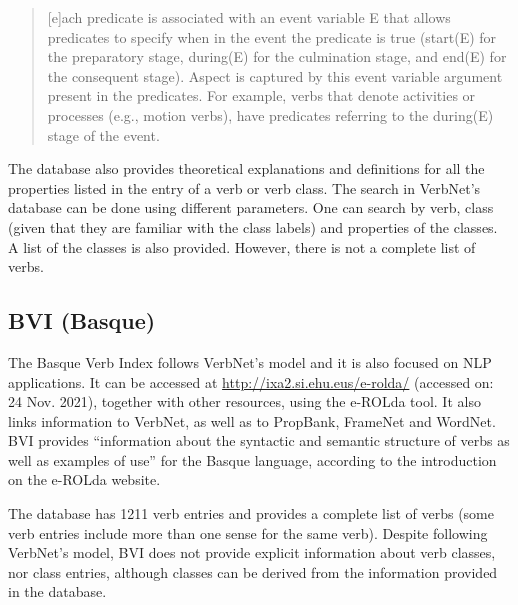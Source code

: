 \documentclass[english]{textolivre}
\begin{document}
\begin{quote}
    [e]ach predicate is associated with an event variable E that allows predicates to specify when in the event the predicate is true (start(E) for the preparatory stage, during(E) for the culmination stage, and end(E) for the consequent stage). Aspect is captured by this event variable argument present in the predicates. For example, verbs that denote activities or processes (e.g., motion verbs), have predicates referring to the during(E) stage of the event.
\end{quote}

The database also provides theoretical explanations and definitions for all the properties listed in the entry of a verb or verb class. The search in VerbNet’s database can be done using different parameters. One can search by verb, class (given that they are familiar with the class labels) and properties of the classes. A list of the classes is also provided. However, there is not a complete list of verbs.

\subsection{BVI (Basque)}

The Basque Verb Index \cite{estarrona_methodology_2015} follows VerbNet’s model and it is also focused on NLP applications. It can be accessed at \url{http://ixa2.si.ehu.eus/e-rolda/} (accessed on: 24 Nov. 2021), together with other resources, using the e-ROLda tool. It also links information to VerbNet, as well as to PropBank, FrameNet and WordNet. BVI provides “information about the syntactic and semantic structure of verbs as well as examples of use” for the Basque language, according to the introduction on the e-ROLda website.

The database has 1211 verb entries and provides a complete list of verbs (some verb entries include more than one sense for the same verb). Despite following VerbNet’s model, BVI does not provide explicit information about verb classes, nor class entries, although classes can be derived from the information provided in the database.
\end{document}
